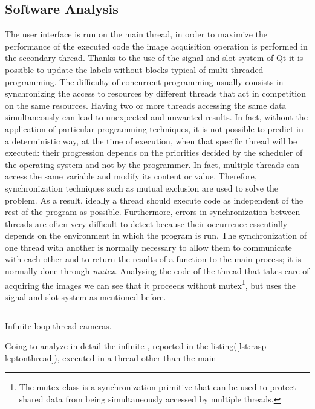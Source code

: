 \subsection{Software Analysis}
\label{ssec:raspberry-softw-analysis}
The user interface is run on the main thread, in order to maximize the
performance of the executed code the image acquisition operation is performed in
the secondary thread. Thanks to the use of the signal and slot system of Qt it
is possible to update the labels without blocks typical of multi-threaded
programming. 
The difficulty of concurrent programming usually consists in
synchronizing the access to resources by different threads that act in
competition on the same resources. Having two or more threads accessing the same
data simultaneously can lead to unexpected and unwanted results. 
In fact, without the application of particular programming techniques, it is not
possible to predict in a deterministic way, at the time of execution, when that
specific thread will be executed: their progression depends on the priorities
decided by the scheduler of the operating system and not by the programmer. 
In fact, multiple threads can access the same variable and modify its content or
value. Therefore, synchronization techniques such as mutual exclusion are used
to solve the problem. As a result, ideally a thread should execute code as
independent of the rest of the program as possible. Furthermore, errors in
synchronization between threads are often very difficult to detect because their
occurrence essentially depends on the environment in which the program is run.
The synchronization of one thread with another is normally necessary to allow
them to communicate with each other and to return the results of a function to
the main process; it is normally done through \emph{mutex}\cite{wiki:thread}.
Analysing the code of the thread that takes care of acquiring the images we can 
see that it proceeds without mutex\footnote{The mutex class is a synchronization
primitive that can be used to protect shared data from being simultaneously
accessed by multiple threads.}, but uses the signal and slot system as mentioned
before.
%
\begin{listing}[ht] 
\inputminted[bgcolor=bg,frame=lines,framesep=2mm, linenos=true, autogobble, breaklines=true, fontsize=\scriptsize]{c++}{software/code/leptonthread.cpp} 
\caption{Infinite loop thread cameras.} 
\label{lst:rasp-leptonthread} 
\end{listing}
%
Going to analyze in detail the infinite , reported in the
listing(\ref{lst:rasp-leptonthread}), executed in a thread other than the main
